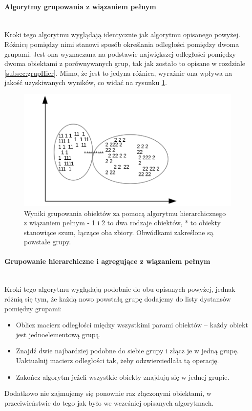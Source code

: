 \documentclass{article}
\newcommand{\myparagraph}[1]{\paragraph{#1}\mbox{}\\}
\begin{document}
\myparagraph{Algorytmy grupowania z wiązaniem pełnym}

Kroki tego algorytmu wyglądają identycznie jak algorytmu opisanego powyżej. Różnicę pomiędzy nimi stanowi sposób określania odległości pomiędzy dwoma grupami. Jest ona wyznaczana na podstawie największej odległości pomiędzy dwoma obiektami z porównywanych grup, tak jak zostało to opisane w rozdziale \ref{subsec:grupHier}. Mimo, że jest to jedyna różnica, wyraźnie ona wpływa na jakość uzyskiwanych wyników, co widać na rysunku \ref{fig:grupHChain}.

\begin{figure}[H] 
	\centering
	\includegraphics[scale=0.95]{grupHChain.png}
	\caption{Wyniki grupowania obiektów za pomocą algorytmu hierarchicznego z wiązaniem pełnym - 1 i 2 to dwa rodzaje obiektów, * to obiekty stanowiące szum, łączące oba zbiory. Obwódkami zakreślone są powstałe grupy.}
	\label{fig:grupHChain}
\end{figure}

\myparagraph{Grupowanie hierarchiczne i agregujące z wiązaniem pełnym}

Kroki tego algorytmu wyglądają podobnie do obu opisanych powyżej, jednak różnią się tym, że każdą nowo powstałą grupę dodajemy do listy dystansów pomiędzy grupami:
\begin{itemize}
	\item Oblicz macierz odległości między wszystkimi parami obiektów – każdy obiekt jest jednoelementową grupą.
	\item Znajdź dwie najbardziej podobne do siebie grupy i złącz je w jedną grupę. Uaktualnij macierz odległości tak, żeby odzwierciedlała tą operację.
	\item Zakończ algorytm jeżeli wszystkie obiekty znajdują się w jednej grupie.
\end{itemize}

Dodatkowo nie zajmujemy się ponownie raz złączonymi obiektami, w przeciwieństwie do tego jak było we wcześniej opisanych algorytmach.
\end{document}
